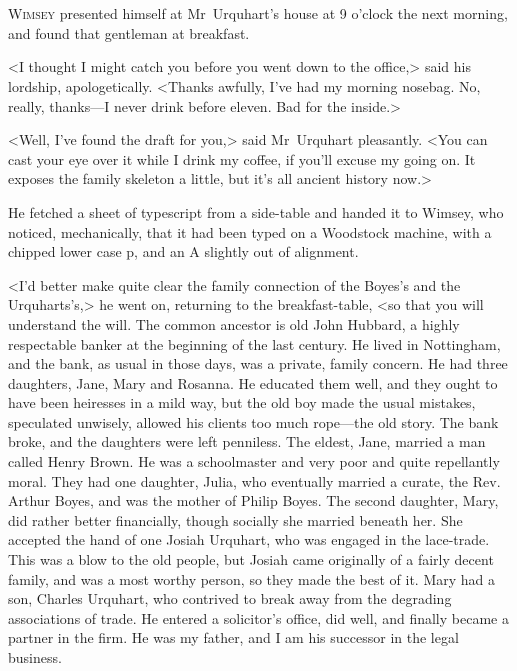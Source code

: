 \chapter[Chapter \thechapter]{}
\lettrine{W}{imsey} presented himself at Mr~Urquhart's house at 9 o'clock the next morning, and found that gentleman at breakfast.

\zz
<I thought I might catch you before you went down to the office,> said his lordship, apologetically. <Thanks awfully, I've had my morning nosebag. No, really, thanks—I never drink before eleven. Bad for the inside.>

<Well, I've found the draft for you,> said Mr~Urquhart pleasantly. <You can cast your eye over it while I drink my coffee, if you'll excuse my going on. It exposes the family skeleton a little, but it's all ancient history now.>

He fetched a sheet of typescript from a side-table and handed it to Wimsey, who noticed, mechanically, that it had been typed on a Woodstock machine, with a chipped lower case p, and an A slightly out of alignment.

<I'd better make quite clear the family connection of the Boyes's and the Urquharts's,> he went on, returning to the breakfast-table, <so that you will understand the will. The common ancestor is old John Hubbard, a highly respectable banker at the beginning of the last century. He lived in Nottingham, and the bank, as usual in those days, was a private, family concern. He had three daughters, Jane, Mary and Rosanna. He educated them well, and they ought to have been heiresses in a mild way, but the old boy made the usual mistakes, speculated unwisely, allowed his clients too much rope—the old story. The bank broke, and the daughters were left penniless. The eldest, Jane, married a man called Henry Brown. He was a schoolmaster and very poor and quite repellantly moral. They had one daughter, Julia, who eventually married a curate, the Rev. Arthur Boyes, and was the mother of Philip Boyes. The second daughter, Mary, did rather better financially, though socially she married beneath her. She accepted the hand of one Josiah Urquhart, who was engaged in the lace-trade. This was a blow to the old people, but Josiah came originally of a fairly decent family, and was a most worthy person, so they made the best of it. Mary had a son, Charles Urquhart, who contrived to break away from the degrading associations of trade. He entered a solicitor's office, did well, and finally became a partner in the firm. He was my father, and I am his successor in the legal business.

